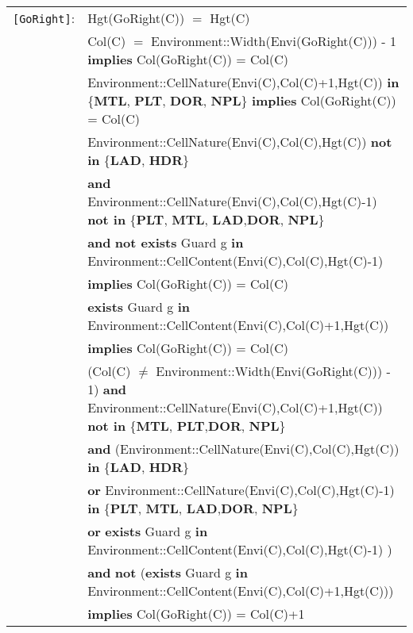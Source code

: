 \documentclass[7pt]{article}
\begin{document}
\begin{tabular}{rl}
\texttt{[GoRight]}: & \textrm{Hgt(GoRight(C))} $=$ \textrm{Hgt(C)} \\
& \textrm{Col(C)} $=$ Environment::Width(Envi(GoRight(C))) - 1 \textbf{implies} \textrm{Col(GoRight(C))} = \textrm{Col(C)} \\
& \textrm{Environment::CellNature(Envi(C),Col(C)+1,Hgt(C))} \textbf{in} \{\textbf{MTL}, \textbf{PLT}, \textbf{DOR}, \textbf{NPL}\} \textbf{implies} \textrm{Col(GoRight(C))} = \textrm{Col(C)} \\
& \textrm{Environment::CellNature(Envi(C),Col(C),Hgt(C))} \textbf{not in} \{\textbf{LAD}, \textbf{HDR}\}
\\ & \quad\quad \textbf{and} \textrm{Environment::CellNature(Envi(C),Col(C),Hgt(C)-1)} \textbf{not in} \{\textbf{PLT}, \textbf{MTL}, \textbf{LAD},\textbf{DOR}, \textbf{NPL}\} \\
& \quad\quad \textbf{and} \textbf{not exists} \textrm{Guard} g \textbf{in} \textrm{Environment::CellContent(Envi(C),Col(C),Hgt(C)-1)} \\
& \quad\quad \textbf{implies} \textrm{Col(GoRight(C))} = \textrm{Col(C)} \\
& \textbf{exists} \textrm{Guard} g \textbf{in} \textrm{Environment::CellContent(Envi(C),Col(C)+1,Hgt(C))} \\ & \quad\quad \textbf{implies} \textrm{Col(GoRight(C))} = \textrm{Col(C)} \\

& (\textrm{Col(C)} $\neq$  Environment::Width(Envi(GoRight(C))) - 1) \textbf{and} \textrm{Environment::CellNature(Envi(C),Col(C)+1,Hgt(C))} \textbf{not in} \{\textbf{MTL}, \textbf{PLT},\textbf{DOR}, \textbf{NPL}\} \\
& \quad\quad \textbf{and} (\textrm{Environment::CellNature(Envi(C),Col(C),Hgt(C))} \textbf{in} \{\textbf{LAD}, \textbf{HDR}\} \\
& \quad\quad\quad\quad \textbf{or} \textrm{Environment::CellNature(Envi(C),Col(C),Hgt(C)-1)} \textbf{in} \{\textbf{PLT}, \textbf{MTL}, \textbf{LAD},\textbf{DOR}, \textbf{NPL}\} \\
& \quad\quad\quad\quad \textbf{or} \textbf{exists} \textrm{Guard} g \textbf{in} \textrm{Environment::CellContent(Envi(C),Col(C),Hgt(C)-1)} ) \\
& \quad\quad \textbf{and} \textbf{not} (\textbf{exists} \textrm{Guard} g \textbf{in} \textrm{Environment::CellContent(Envi(C),Col(C)+1,Hgt(C))}) \\
& \quad\quad \textbf{implies} \textrm{Col(GoRight(C))} = \textrm{Col(C)}+1 \\


\end{tabular}
\end{document}
